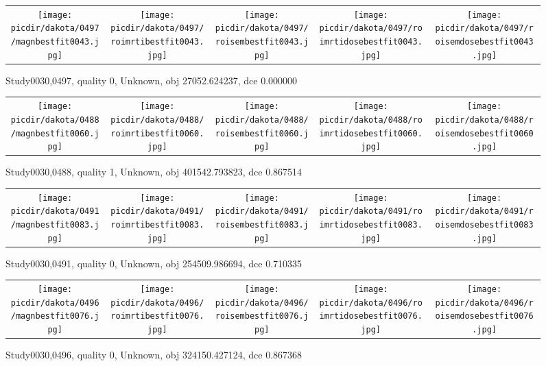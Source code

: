 \documentclass{article}
\newcommand{\picdir}{pdffig}
\begin{document}
\begin{figure} \begin{tabular}{ccccc} \scalebox{0.21}{\texttt{[image: \\picdir/dakota/0497/magnbestfit0043.jpg]}} & \scalebox{0.21}{\texttt{[image: \\picdir/dakota/0497/roimrtibestfit0043.jpg]}} & \scalebox{0.21}{\texttt{[image: \\picdir/dakota/0497/roisembestfit0043.jpg]}}  & \scalebox{0.21}{\texttt{[image: \\picdir/dakota/0497/roimrtidosebestfit0043.jpg]}} & \scalebox{0.21}{\texttt{[image: \\picdir/dakota/0497/roisemdosebestfit0043.jpg]}} \end{tabular} \caption{Study0030,0497, quality 0, Unknown, obj 27052.624237, dce 0.000000  } \label{Study00300497} \end{figure}
\clearpage
\begin{figure} \begin{tabular}{ccccc} \scalebox{0.21}{\texttt{[image: \\picdir/dakota/0488/magnbestfit0060.jpg]}} & \scalebox{0.21}{\texttt{[image: \\picdir/dakota/0488/roimrtibestfit0060.jpg]}} & \scalebox{0.21}{\texttt{[image: \\picdir/dakota/0488/roisembestfit0060.jpg]}}  & \scalebox{0.21}{\texttt{[image: \\picdir/dakota/0488/roimrtidosebestfit0060.jpg]}} & \scalebox{0.21}{\texttt{[image: \\picdir/dakota/0488/roisemdosebestfit0060.jpg]}} \end{tabular} \caption{Study0030,0488, quality 1, Unknown, obj 401542.793823, dce 0.867514  } \label{Study00300488} \end{figure}
\begin{figure} \begin{tabular}{ccccc} \scalebox{0.21}{\texttt{[image: \\picdir/dakota/0491/magnbestfit0083.jpg]}} & \scalebox{0.21}{\texttt{[image: \\picdir/dakota/0491/roimrtibestfit0083.jpg]}} & \scalebox{0.21}{\texttt{[image: \\picdir/dakota/0491/roisembestfit0083.jpg]}}  & \scalebox{0.21}{\texttt{[image: \\picdir/dakota/0491/roimrtidosebestfit0083.jpg]}} & \scalebox{0.21}{\texttt{[image: \\picdir/dakota/0491/roisemdosebestfit0083.jpg]}} \end{tabular} \caption{Study0030,0491, quality 0, Unknown, obj 254509.986694, dce 0.710335  } \label{Study00300491} \end{figure}
\begin{figure} \begin{tabular}{ccccc} \scalebox{0.21}{\texttt{[image: \\picdir/dakota/0496/magnbestfit0076.jpg]}} & \scalebox{0.21}{\texttt{[image: \\picdir/dakota/0496/roimrtibestfit0076.jpg]}} & \scalebox{0.21}{\texttt{[image: \\picdir/dakota/0496/roisembestfit0076.jpg]}}  & \scalebox{0.21}{\texttt{[image: \\picdir/dakota/0496/roimrtidosebestfit0076.jpg]}} & \scalebox{0.21}{\texttt{[image: \\picdir/dakota/0496/roisemdosebestfit0076.jpg]}} \end{tabular} \caption{Study0030,0496, quality 0, Unknown, obj 324150.427124, dce 0.867368  } \label{Study00300496} \end{figure}
\end{document}
